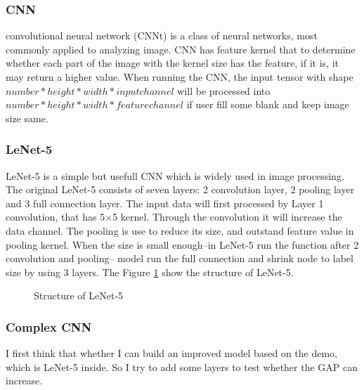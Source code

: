 \documentclass{article}
\begin{document}
\subsubsection{CNN}
convolutional neural network (CNNt) is a class of neural networks, most commonly applied to analyzing image. CNN has feature kernel that to determine whether each part of the image with the kernel size has the feature, if it is, it may return a higher value. When running the CNN, the input tensor with shape $number*height*width*input channel$ will be processed into $number*height*width*feature channel$ if user fill some blank and keep image size same.

\subsubsection{LeNet-5}
LeNet-5 is a simple but usefull CNN which is widely used in image processing. The original LeNet-5 consists of seven layers: 2 convolution layer, 2 pooling layer and 3 full connection layer. The input data will first processed by Layer 1 convolution, that has 5$\times$5 kernel. Through the convolution it will increase the data channel. The pooling is use to reduce its size, and outstand feature value in pooling kernel. When the size is small enough--in LeNet-5 run the function after 2 convolution and pooling-- model run the full connection and shrink node to label size by using 3 layers. The Figure \ref{LeNet} show the structure of LeNet-5.
\begin{figure}[h]
  \centering
  \caption{Structure of LeNet-5}
  \label{LeNet}
\end{figure} 

\subsubsection{Complex CNN}
I first think that whether I can build an improved model based on the demo, which is LeNet-5 inside. So I try to add some layers to test whether the GAP can increase.
\end{document}
